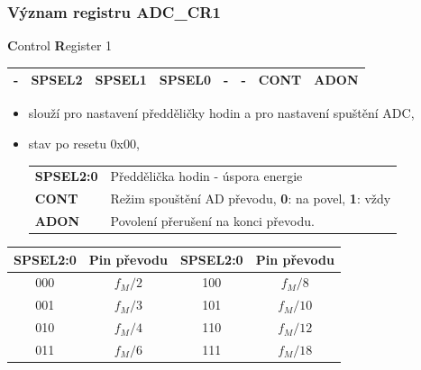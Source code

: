	\begin{frame}
    \frametitle{Význam registru ADC\_CR1}

		\textbf{C}ontrol \textbf{R}egister 1

\begin{center}
			\tiny
			\begin{tabular}{| p{9mm} | p{9mm} | p{9mm} | p{9mm} | p{9mm} | p{9mm} | p{9mm} | p{9mm} |}
				\hline
				\hline
				\textbf{-} & \textbf{SPSEL2} & \textbf{SPSEL1} & \textbf{SPSEL0} & \textbf{-} & \textbf{-} & \textbf{CONT} & \textbf{ADON} \\
				\hline
				\hline
			\end{tabular}
		\end{center}
				
		\begin{itemize}
			\item slouží pro nastavení předděličky hodin a pro nastavení spuštění ADC,
			\item stav po resetu 0x00,
			\small
			\begin{center}
				\begin{tabular}{l p{80mm}}
					\textbf{SPSEL2:0} & Předdělička hodin - úspora energie \\
					\textbf{CONT} & Režim spouštění AD převodu, \textbf{0}: na povel, \textbf{1}: vždy \\
					\textbf{ADON} & Povolení přerušení na konci převodu. \\
				\end{tabular}
			\end{center}
		\end{itemize}
		
		\begin{center}
		\small
			\begin{tabular}{c | c || c | c}
				\textbf{SPSEL2:0} & Pin převodu & \textbf{SPSEL2:0} & Pin převodu \\
				\hline
				000 & $f_{M}/2$ & 100 & $f_{M}/8$ \\
				001 & $f_{M}/3$ & 101 & $f_{M}/10$ \\
				010 & $f_{M}/4$ & 110 & $f_{M}/12$ \\
				011 & $f_{M}/6$ & 111 & $f_{M}/18$ \\
			\end{tabular}
		\end{center}
	\end{frame}
	
